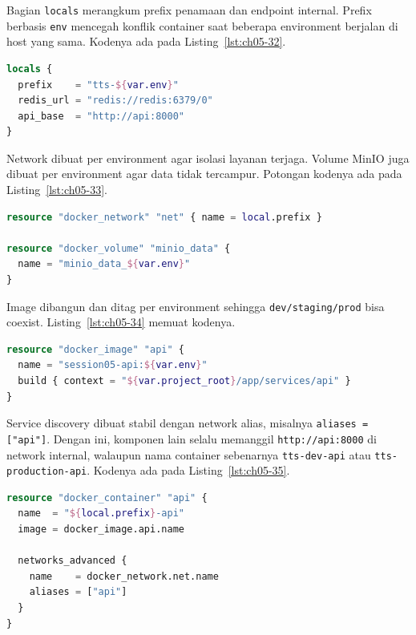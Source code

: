 Bagian \texttt{locals} merangkum prefix penamaan dan endpoint internal. Prefix berbasis \texttt{env} mencegah konflik container saat beberapa environment berjalan di host yang sama. Kodenya ada pada Listing~\ref{lst:ch05-32}.

\begin{lstlisting}[language=terraform, caption={Potongan kode Terraform pada main.tf}, label={lst:ch05-32}]
locals {
  prefix    = "tts-${var.env}"
  redis_url = "redis://redis:6379/0"
  api_base  = "http://api:8000"
}
\end{lstlisting}

Network dibuat per environment agar isolasi layanan terjaga. Volume MinIO juga dibuat per environment agar data tidak tercampur. Potongan kodenya ada pada Listing~\ref{lst:ch05-33}.

\begin{lstlisting}[language=terraform, caption={Potongan kode Terraform pada main.tf (2)}, label={lst:ch05-33}]
resource "docker_network" "net" { name = local.prefix }

resource "docker_volume" "minio_data" {
  name = "minio_data_${var.env}"
}
\end{lstlisting}

Image dibangun dan ditag per environment sehingga \texttt{dev/staging/prod} bisa coexist. Listing~\ref{lst:ch05-34} memuat kodenya.

\begin{lstlisting}[language=terraform, caption={Potongan kode Terraform pada main.tf (3)}, label={lst:ch05-34}]
resource "docker_image" "api" {
  name = "session05-api:${var.env}"
  build { context = "${var.project_root}/app/services/api" }
}
\end{lstlisting}

Service discovery dibuat stabil dengan network alias, misalnya \texttt{aliases = ["api"]}. Dengan ini, komponen lain selalu memanggil \texttt{http://api:8000} di network internal, walaupun nama container sebenarnya \texttt{tts-dev-api} atau \texttt{tts-production-api}. Kodenya ada pada Listing~\ref{lst:ch05-35}.

\begin{lstlisting}[language=terraform, caption={Potongan kode Terraform pada main.tf (4)}, label={lst:ch05-35}]
resource "docker_container" "api" {
  name  = "${local.prefix}-api"
  image = docker_image.api.name

  networks_advanced {
    name    = docker_network.net.name
    aliases = ["api"]
  }
}
\end{lstlisting}


